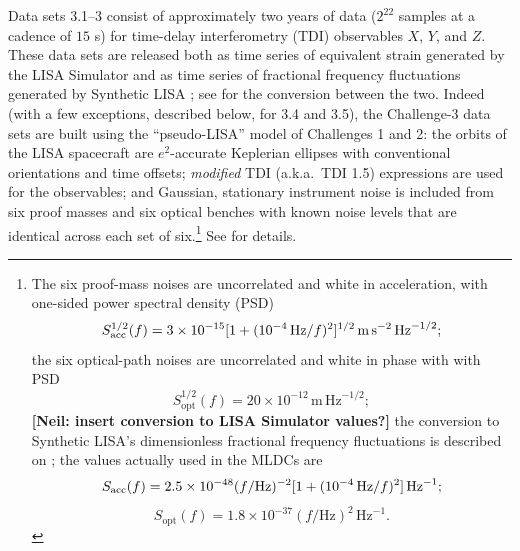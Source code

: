 \documentclass{iopart}
\begin{document}
Data sets 3.1--3 consist of approximately two years of data ($2^{22}$ samples at a cadence of $15$ s) for time-delay interferometry (TDI) observables $X$, $Y$, and $Z$. These data sets are released both as time series of equivalent strain generated by the LISA Simulator \cite{lisasimulator} and as time series of fractional frequency fluctuations generated by Synthetic LISA \cite{synthlisa}; see \cite[p.\ S556]{mldcgwdaw2} for the conversion between the two. Indeed (with a few exceptions, described below, for 3.4 and 3.5), the Challenge-3 data sets are built using the ``pseudo-LISA'' model of Challenges 1 and 2: the orbits of the LISA spacecraft are $e^2$-accurate Keplerian ellipses with conventional orientations and time offsets; \emph{modified} TDI (a.k.a.\ TDI 1.5) expressions are used for the observables; and Gaussian, stationary instrument noise is included from six proof masses and six optical benches with known noise levels that are identical across each set of six.\footnote{The six proof-mass noises are uncorrelated and white in acceleration, with one-sided power spectral density (PSD)
%
\begin{displaymath}
S_\mathrm{acc}^{1/2}(f) = 3 \times 10^{-15} [1 + (10^{-4}\,{\rm Hz}/f)^2]^{1/2} \, \mathrm{m}\, \mathrm{s}^{-2}\, \mathrm{Hz}^{-1/2};
\end{displaymath}
%
the six optical-path noises are uncorrelated and white in phase with with PSD
%
\begin{displaymath}
S_\mathrm{opt}^{1/2}(f) = 20 \times 10^{-12} \, \mathrm{m}\, \mathrm{Hz}^{-1/2};
\end{displaymath}
%
\textbf{[Neil: insert conversion to LISA Simulator values?]}
the conversion to Synthetic LISA's dimensionless fractional frequency fluctuations is described on \cite[p.\ 6]{synthlisa}; the values actually used in the MLDCs are
%
\begin{displaymath}
S_\mathrm{acc}(f) = 2.5 \times 10^{-48} (f/\mathrm{Hz})^{-2} [1 + (10^{-4}\,{\rm Hz}/f)^2] \, \mathrm{Hz}^{-1};
\end{displaymath}
\begin{displaymath}
S_\mathrm{opt}(f) = 1.8 \times 10^{-37} (f/\mathrm{Hz})^{2} \, \mathrm{Hz}^{-1}.
\end{displaymath}
} See \cite{mldcgwdaw2} for details.
\end{document}
